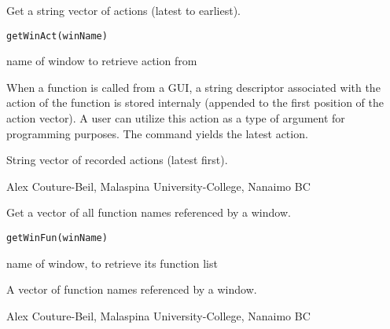 \documentclass[letterpaper]{book}
\begin{document}
\begin{Description}\relax
Get a string vector of actions (latest to earliest).
\end{Description}
\begin{Usage}
\begin{verbatim}getWinAct(winName)\end{verbatim}
\end{Usage}
\begin{Arguments}
\begin{ldescription}
\item[\code{winName}] name of window to retrieve action from
\end{ldescription}
\end{Arguments}
\begin{Details}\relax
When a function is called from a GUI, a string descriptor associated with 
the action of the function is stored internaly (appended to the first position 
of the action vector). A user can utilize this action as a type of argument 
for programming purposes. The command  yields the latest action.
\end{Details}
\begin{Value}
String vector of recorded actions (latest first).
\end{Value}
\begin{Author}\relax
Alex Couture-Beil, Malaspina University-College, Nanaimo BC
\end{Author}

\begin{Description}\relax
Get a vector of all function names referenced by a window.
\end{Description}
\begin{Usage}
\begin{verbatim}
getWinFun(winName)
\end{verbatim}
\end{Usage}
\begin{Arguments}
\begin{ldescription}
\item[\code{winName}] name of window, to retrieve its function list
\end{ldescription}
\end{Arguments}
\begin{Value}
A vector of function names referenced by a window.
\end{Value}
\begin{Author}\relax
Alex Couture-Beil, Malaspina University-College, Nanaimo BC
\end{Author}
\end{document}
